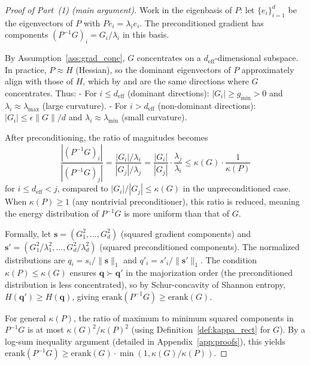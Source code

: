 \documentclass{article}
\newcommand{\erank}{\mathrm{erank}}
\begin{document}
\begin{proof}[Proof of Part~(1) (main argument)]
Work in the eigenbasis of $P$: let $\{e_i\}_{i=1}^d$ be the eigenvectors of $P$ with $Pe_i = \lambda_i e_i$. The preconditioned gradient has components $(P^{-1}G)_i = G_i/\lambda_i$ in this basis.

By Assumption~\ref{ass:grad_conc}, $G$ concentrates on a $d_\mathrm{eff}$-dimensional subspace. In practice, $P\approx H$ (Hessian), so the dominant eigenvectors of $P$ approximately align with those of $H$, which by \citet{ghorbani2019investigation} and \citet{gurari2018gradient} are the same directions where $G$ concentrates. Thus:
- For $i \leq d_\mathrm{eff}$ (dominant directions): $|G_i| \geq g_{\min} > 0$ and $\lambda_i \approx \lambda_{\max}$ (large curvature).
- For $i > d_\mathrm{eff}$ (non-dominant directions): $|G_i| \leq \epsilon\|G\|/d$ and $\lambda_i \approx \lambda_{\min}$ (small curvature).

After preconditioning, the ratio of magnitudes becomes
\[
\frac{|(P^{-1}G)_i|}{|(P^{-1}G)_j|} = \frac{|G_i|/\lambda_i}{|G_j|/\lambda_j} = \frac{|G_i|}{|G_j|} \cdot \frac{\lambda_j}{\lambda_i} \leq \kappa(G) \cdot \frac{1}{\kappa(P)}
\]
for $i \leq d_\mathrm{eff} < j$, compared to $|G_i|/|G_j| \leq \kappa(G)$ in the unpreconditioned case. When $\kappa(P) \geq 1$ (any nontrivial preconditioner), this ratio is reduced, meaning the energy distribution of $P^{-1}G$ is more uniform than that of $G$.

Formally, let $\bm{s} = (G_1^2,\ldots,G_d^2)$ (squared gradient components) and $\bm{s}' = (G_1^2/\lambda_1^2, \ldots, G_d^2/\lambda_d^2)$ (squared preconditioned components). The normalized distributions are $q_i = s_i / \|\bm{s}\|_1$ and $q'_i = s'_i / \|\bm{s}'\|_1$. The condition $\kappa(P) \leq \kappa(G)$ ensures $\bm{q} \succ \bm{q}'$ in the majorization order (the preconditioned distribution is less concentrated), so by Schur-concavity of Shannon entropy, $H(\bm{q}') \geq H(\bm{q})$, giving $\erank(P^{-1}G) \geq \erank(G)$.

For general $\kappa(P)$, the ratio of maximum to minimum squared components in $P^{-1}G$ is at most $\kappa(G)^2/\kappa(P)^2$ (using Definition~\ref{def:kappa_rect} for $G$). By a log-sum inequality argument (detailed in Appendix~\ref{app:proofs}), this yields $\erank(P^{-1}G) \geq \erank(G) \cdot \min(1, \kappa(G)/\kappa(P))$.
\end{proof}
\end{document}
